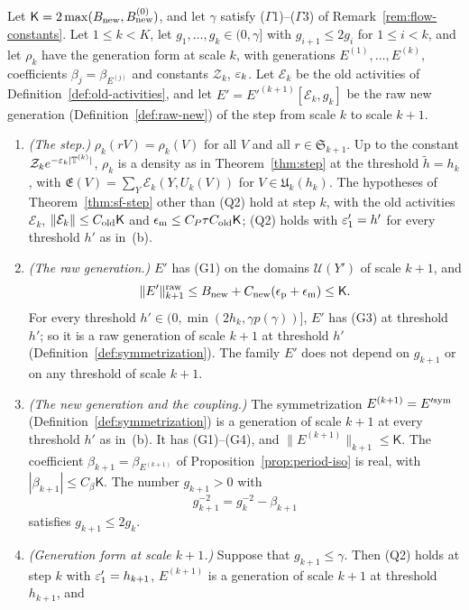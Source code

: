 \begin{theorem}\label{thm:gen-step}
Let $\mathsf K=2\max(B_{\rm new},B^{(0)}_{\rm new})$, and let $\gamma$ satisfy ($\Gamma$1)--($\Gamma$3) of Remark~\ref{rem:flow-constants}. Let $1\le k<K$, let $g_1,\dots,g_k\in(0,\gamma]$ with $g_{i+1}\le2g_i$ for $1\le i<k$, and let $\rho_k$ have the generation form at scale $k$, with generations $E^{(1)},\dots,E^{(k)}$, coefficients $\beta_j=\beta_{E^{(j)}}$ and constants $\mathcal Z_k$, $\varepsilon_k$. Let $\mathcal E_k$ be the old activities of Definition~\ref{def:old-activities}, and let $E'=E'^{(k+1)}[\mathcal E_k,g_k]$ be the raw new generation (Definition~\ref{def:raw-new}) of the step from scale $k$ to scale $k+1$.
\begin{enumerate}[label=(\alph*)]
\item \emph{(The step.)} $\rho_k(rV)=\rho_k(V)$ for all $V$ and all $r\in\mathfrak S_{k+1}$. Up to the constant $\mathcal Z_ke^{-\varepsilon_k|\mathbb T^{(k)}|}$, $\rho_k$ is a density as in Theorem~\ref{thm:step} at the threshold $\tilde h=h_k$, with $\mathfrak E(V)=\sum_Y\mathcal E_k(Y,U_k(V))$ for $V\in\mathfrak U_k(h_k)$. The hypotheses of Theorem~\ref{thm:sf-step} other than (Q2) hold at step $k$, with the old activities $\mathcal E_k$, $\|\mathcal E_k\|\le C_{\rm old}\mathsf K$ and $\epsilon_{\rm m}\le C_P\tau C_{\rm old}\mathsf K$; (Q2) holds with $\varepsilon'_1=h'$ for every threshold $h'$ as in~(b).
\item \emph{(The raw generation.)} $E'$ has (G1) on the domains $\mathcal U(Y')$ of scale $k+1$, and
\[
\|E'\|^{\rm raw}_{k+1}\le B_{\rm new}+C_{\rm new}(\epsilon_{\rm p}+\epsilon_{\rm m})\le\mathsf K .
\]
For every threshold $h'\in(0,\min(2h_k,\gamma p(\gamma))]$, $E'$ has (G3) at threshold $h'$; so it is a raw generation of scale $k+1$ at threshold $h'$ (Definition~\ref{def:symmetrization}). The family $E'$ does not depend on $g_{k+1}$ or on any threshold of scale $k+1$.
\item \emph{(The new generation and the coupling.)} The symmetrization $E^{(k+1)}=E'^{\rm sym}$ (Definition~\ref{def:symmetrization}) is a generation of scale $k+1$ at every threshold $h'$ as in~(b). It has (G1)--(G4), and $\|E^{(k+1)}\|_{k+1}\le\mathsf K$. The coefficient $\beta_{k+1}=\beta_{E^{(k+1)}}$ of Proposition~\ref{prop:period-iso} is real, with $|\beta_{k+1}|\le C_\beta\mathsf K$. The number $g_{k+1}>0$ with
\[
g_{k+1}^{-2}=g_k^{-2}-\beta_{k+1}
\]
satisfies $g_{k+1}\le2g_k$.
\item \emph{(Generation form at scale $k+1$.)} Suppose that $g_{k+1}\le\gamma$. Then (Q2) holds at step $k$ with $\varepsilon'_1=h_{k+1}$, $E^{(k+1)}$ is a generation of scale $k+1$ at threshold $h_{k+1}$, and

\end{enumerate}
\end{theorem}
